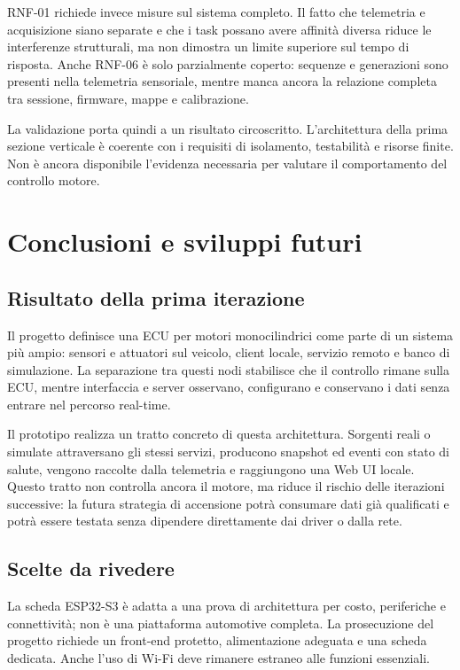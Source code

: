 \documentclass{article}
\begin{document}
RNF-01 richiede invece misure sul sistema completo. Il fatto che telemetria e
acquisizione siano separate e che i task possano avere affinità diversa riduce
le interferenze strutturali, ma non dimostra un limite superiore sul tempo di
risposta. Anche RNF-06 è solo parzialmente coperto: sequenze e generazioni sono
presenti nella telemetria sensoriale, mentre manca ancora la relazione completa
tra sessione, firmware, mappe e calibrazione.

La validazione porta quindi a un risultato circoscritto. L'architettura della
prima sezione verticale è coerente con i requisiti di isolamento, testabilità e
risorse finite. Non è ancora disponibile l'evidenza necessaria per valutare il
comportamento del controllo motore.

\section{Conclusioni e sviluppi futuri}
\label{sec:conclusioni}

\subsection{Risultato della prima iterazione}

Il progetto definisce una ECU per motori monocilindrici come parte di un sistema
più ampio: sensori e attuatori sul veicolo, client locale, servizio remoto e
banco di simulazione. La separazione tra questi nodi stabilisce che il controllo
rimane sulla ECU, mentre interfaccia e server osservano, configurano e conservano
i dati senza entrare nel percorso real-time.

Il prototipo realizza un tratto concreto di questa architettura. Sorgenti reali
o simulate attraversano gli stessi servizi, producono snapshot ed eventi con
stato di salute, vengono raccolte dalla telemetria e raggiungono una Web UI
locale. Questo tratto non controlla ancora il motore, ma riduce il rischio delle
iterazioni successive: la futura strategia di accensione potrà consumare dati
già qualificati e potrà essere testata senza dipendere direttamente dai driver
o dalla rete.

\subsection{Scelte da rivedere}

La scheda ESP32-S3 è adatta a una prova di architettura per costo, periferiche e
connettività; non è una piattaforma automotive completa. La prosecuzione del
progetto richiede un front-end protetto, alimentazione adeguata e una scheda
dedicata. Anche l'uso di Wi-Fi deve rimanere estraneo alle funzioni essenziali.
\end{document}
